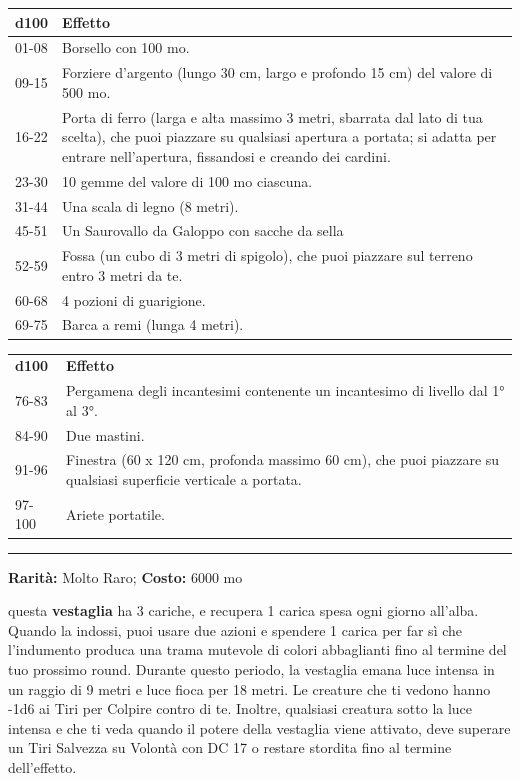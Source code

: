\begin{multicols}{2}
\begin{tabularx}{0.48\textwidth}{lX}
\textbf{d100} & \textbf{Effetto}\\
\hline
01-08 &Borsello con 100 mo.\\
09-15& Forziere d'argento (lungo 30 cm, largo e profondo 15 cm) del valore di 500 mo.\\
16-22& Porta di ferro (larga e alta massimo 3 metri, sbarrata dal lato di tua scelta), che puoi piazzare su qualsiasi apertura a portata; si adatta per entrare nell'apertura, fissandosi e creando dei cardini.\\
23-30 &10 gemme del valore di 100 mo ciascuna.\\
31-44 &Una scala di legno (8 metri).\\
45-51 &Un Saurovallo da Galoppo con sacche da sella \\
52-59 & Fossa (un cubo di 3 metri di spigolo), che puoi piazzare sul terreno entro 3 metri da te.\\
60-68 &4 pozioni di guarigione. \\
69-75 &Barca a remi (lunga 4 metri).\\
\end{tabularx}
\begin{tabularx}{0.48\textwidth}{lX}
\textbf{d100} & \textbf{Effetto}\\
76-83& Pergamena degli incantesimi contenente un incantesimo di livello dal 1° al 3°.\\
84-90& Due mastini.\\
91-96 &Finestra (60 x 120 cm, profonda massimo 60 cm), che puoi piazzare su qualsiasi superficie verticale a portata.\\
97-100 &Ariete portatile.
\end{tabularx}


\medskip

\smallskip\noindent\rule{\linewidth}{2pt}  \hypertarget{TunicadeiColoriScintillanti}{}\medskip{}\noindent\label{TunicadeiColoriScintillanti}

\textbf{Rarità:} Molto Raro; \textbf{Costo:} 6000 mo

questa \textbf{vestaglia} ha 3 cariche, e recupera 1 carica spesa ogni giorno all'alba. Quando la indossi, puoi usare due azioni e spendere 1 carica per far sì che l'indumento produca una trama mutevole di colori abbaglianti fino al termine del tuo prossimo round. Durante questo periodo, la vestaglia emana luce intensa in un raggio di 9 metri e luce fioca per 18 metri. Le creature che ti vedono hanno -1d6 ai Tiri per Colpire contro di te. Inoltre, qualsiasi creatura sotto la luce intensa e che ti veda quando il potere della vestaglia viene attivato, deve superare un Tiri Salvezza su Volontà con DC 17 o restare stordita fino al termine dell'effetto.


\end{multicols}
